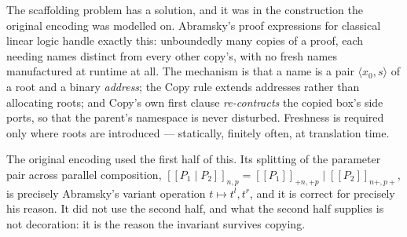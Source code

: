 \documentclass[11pt]{article}
\theoremstyle{definition}
\theoremstyle{plain}
\theoremstyle{remark}
\newcommand{\enc}[1]{[\![#1]\!]}
\begin{document}
The scaffolding problem has a solution, and it was in the construction the
original encoding was modelled on. Abramsky's proof expressions for
classical linear logic \cite{Abramsky93} handle exactly this: unboundedly
many copies of a proof, each needing names distinct from every other
copy's, with no fresh names manufactured at runtime at all. The mechanism
is that a name is a pair $\langle x_0, s \rangle$ of a root and a binary
\emph{address}; the Copy rule extends addresses rather than allocating
roots; and Copy's own first clause \emph{re-contracts} the copied box's
side ports, so that the parent's namespace is never disturbed. Freshness
is required only where roots are introduced --- statically, finitely
often, at translation time.

The original encoding used the first half of this. Its splitting of the
parameter pair across parallel composition,
$\enc{P_1 \mid P_2}_{n,p} = \enc{P_1}_{+n,+p} \mid \enc{P_2}_{n+,p+}$, is
precisely Abramsky's variant operation $t \mapsto t^l, t^r$, and it is
correct for precisely his reason. It did not use the second half, and
what the second half supplies is not decoration: it is the reason the
invariant survives copying.
\end{document}
